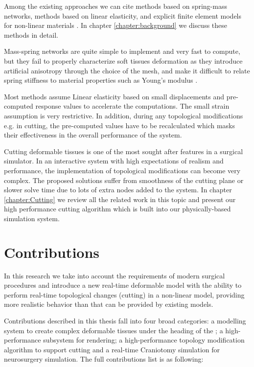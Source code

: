 
Among the existing approaches we can cite methods based on spring-mass networks, methods based 
on linear elasticity, and explicit finite element models for non-linear materials 
\cite{Gibson1997a,Meier2005}. In chapter \ref{chapter:background} we discuss these methods in detail.  

Mass-spring networks are quite simple to implement and very fast to compute, but they fail to properly 
characterize soft tissues deformation as they introduce artificial anisotropy through the choice of the 
mesh, and make it difficult to relate spring stiffness to material properties such as Young's modulus 
\cite{Courtecuisse2010}.

Most methods assume Linear elasticity based on small displacements and pre-computed 
response values to accelerate the computations. The small strain assumption is very restrictive. In 
addition, during any topological modifications e.g. in cutting, the pre-computed values 
have to be recalculated which masks their effectiveness in the overall performance of the system.

Cutting deformable tissues is one of the most sought after features in a surgical simulator. In an interactive 
system with high expectations of realism and performance, the implementation of topological 
modifications can become very complex. The proposed solutions suffer from smoothness of the cutting 
plane or slower solve time due to lots of extra nodes added to the system. In chapter 
\ref{chapter:Cutting} we review all the related work in this topic and present our high performance 
cutting algorithm which is built into our physically-based simulation system.


\section{Contributions}
\label{sec:contributions}
In this research we take into account the requirements of modern surgical procedures and introduce a 
new real-time deformable model with the ability to perform real-time topological changes (cutting) in a 
non-linear model, providing more realistic behavior than that can be provided by existing models. 

Contributions described in this thesis fall into four broad categories: a modelling system to create 
complex deformable tissues under the heading of the \blob; a high-performance subsystem for 
rendering; a high-performance topology modification algorithm to support cutting and a  
real-time Craniotomy simulation for neurosurgery simulation. The full contributions list is as 
following:

